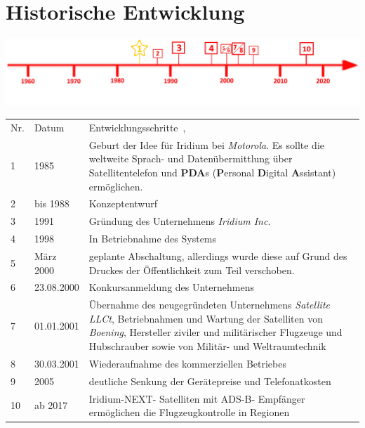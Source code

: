 \section*{Historische Entwicklung}
\includegraphics[width=\textwidth]{Kapitel/Iridium/Grafiken/Zeitstrahl_Iridium_rot}
\par
\noindent
{}
\begin{tabular}{p{0.5 cm}p{1.5 cm}p{15.55 cm}}
	Nr. & Datum & Entwicklungsschritte~\cite{I2},~\cite{I4}\\
	1 & 1985 & Geburt der Idee für Iridium bei \textit{Motorola}. Es sollte die weltweite Sprach- und Datenübermittlung über Satellitentelefon und \textbf{PDA}s (\textbf{P}ersonal \textbf{D}igital \textbf{A}ssistant) ermöglichen.\\
	2 & bis 1988 & Konzeptentwurf\\
	3 & 1991 & Gründung des Unternehmens \textit{Iridium Inc}.\\
	4 & 1998  & In Betriebnahme des Systems 
	\\
	5& März 2000 & geplante Abschaltung, allerdings wurde diese auf Grund des Druckes der Öffentlichkeit zum Teil verschoben.\\
	6 & 23.08.2000 & Konkursanmeldung des Unternehmens\\
	7 & 01.01.2001 & Übernahme des neugegründeten Unternehmens \textit{Satellite LLCt}, Betriebnahmen und Wartung der Satelliten von \textit{Boening}, Hersteller ziviler und militärischer Flugzeuge und Hubschrauber sowie von Militär- und Weltraumtechnik\\
	8 & 30.03.2001 & Wiederaufnahme des kommerziellen Betriebes\\
	9 & 2005 & deutliche Senkung der Gerätepreise und Telefonatkosten\\
	10 & ab 2017 & Iridium-NEXT- Satelliten mit ADS-B- Empfänger ermöglichen die Flugzeugkontrolle in Regionen\\
	
\end{tabular}
\par
